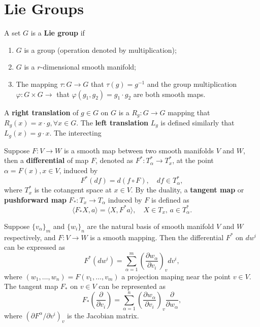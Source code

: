 \section{Lie Groups}
\begin{definition}
A set $G$ is a \textbf{Lie group} if
\begin{enumerate}
\item $G$ is a group (operation denoted by multiplication);
\item $G$ is a $r$-dimensional smooth manifold;
\item The mapping $\tau:G\to G$ that $\tau(g)=g^{-1}$ and the group multiplication $\varphi:G\times G\to$ that $\varphi(g_1,g_2)=g_1\cdot g_2$ are both smooth maps.
\end{enumerate}
A \textbf{right translation} of $g\in G$ on $G$ is a $R_g:G\to G$ mapping that $R_g(x)=x\cdot g,\forall x\in G$. The \textbf{left translation} $L_g$ is defined similarly that $L_g(x)=g\cdot x$. The interecting 
\end{definition}

\begin{definition}
Suppose $F:V\to W$ is a smooth map between two smooth manifolds $V$ and $W$, then a \textbf{differential} of map $F$, denoted as $F^*:T^*_\alpha\to T^*_x$, at the point $\alpha=F(x),x\in V$, induced by
\begin{equation}
F^*(df) = d(f\circ F),\quad df\in T_\alpha^*,
\end{equation}
where $T^*_x$ is the cotangent space at $x\in V$. By the duality, a \textbf{tangent map} or \textbf{pushforward map} $F_*:T_x\to T_\alpha$ induced by  $F$ is defined as
\begin{equation}
\langle F_*X,a\rangle=\langle X,F^*a\rangle,\quad X\in T_x,\,a\in T^*_\alpha.
\label{eq:scalar_product_duality}
\end{equation}
\end{definition}

\begin{theorem}
Suppose $\{v_\alpha\}_m$ and $\{w_i\}_n$ are the natural basis of smooth manifold $V$ and $W$ respectively, and $F:V\to W$ is a smooth mapping. Then the differential $F^*$ on $dw^i$ can be expressed as
\begin{equation}
F^*(dw^i)=\sum_{\alpha=1}^m\left(\frac{\partial w_\alpha}{\partial v_i}\right)_vdv^i,
\label{eq:pullback_map}
\end{equation}
where $(w_1,\dots,w_n)=F(v_1,\dots,v_m)$ a projection maping  near the point $v\in V$. The tangent map $F_*$ on $v\in V$ can be represented as 
\begin{equation}
F_*\left(\frac{\partial}{\partial v_i}\right)=\sum_{\alpha=1}^n\left(\frac{\partial w_\alpha}{\partial v_i}\right)_v\frac{\partial}{\partial w_\alpha},
\label{eq:pushforward_map}
\end{equation}
where $\left(\partial F^\alpha/\partial v^i\right)_v$ is the Jacobian matrix.
\end{theorem}


